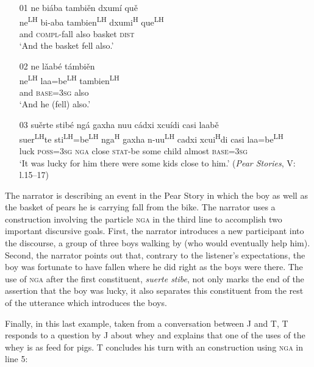 \ea\label{nga}
\begin{itemize}
\item[01]
\glll ne bi\'{a}ba tambi\v{e}n dxum\'{i} qu\v{e} \\
ne\textsuperscript{LH} bi-aba tambien\textsuperscript{LH} dxumi\textsuperscript{H} que\textsuperscript{LH} \\
and \textsc{compl}-fall also basket \textsc{dist} \\
\glt `And the basket fell also.'


\item[02]
\glll ne l\v{a}ab\'{e} t\'{a}mbi\v{e}n \\
ne\textsuperscript{LH} laa=be\textsuperscript{LH} tambien\textsuperscript{LH} \\
and \textsc{base}=3\textsc{sg} also \\
\glt `And he (fell) also.' 


\item[03]
\glll su\v{e}rte stib\'{e} ng\'{a} gaxha nuu c\'{a}dxi xcu\'{i}di casi laab\v{e}  \\
suer\textsuperscript{LH}te sti\textsuperscript{LH}=be\textsuperscript{LH} nga\textsuperscript{H} gaxha n-uu\textsuperscript{LH} cadxi xcui\textsuperscript{H}di casi laa=be\textsuperscript{LH}  \\
luck \textsc{poss}=3\textsc{sg} \textsc{nga} close \textsc{stat}-be some child almost \textsc{base}=3\textsc{sg}  \\
\glt `It was lucky for him there were some kids close to him.' \hfill (\textit{Pear Stories}, V: l.15--17)

\end{itemize}
\z
The narrator is describing an event in the Pear Story in which the boy as well as the basket of pears he is carrying fall from the bike. The narrator uses a construction involving the particle \textsc{nga} in the third line to accomplish two important discursive goals. First, the narrator introduces a new participant into the discourse, a group of three boys walking by (who would eventually help him). Second, the narrator points out that, contrary to the listener's expectations, the boy was fortunate to have fallen where he did right as the boys were there. The use of \textsc{nga} after the first constituent, \textit{suerte stibe}, not only marks the end of the assertion that the boy was lucky, it also separates this constituent from the rest of the utterance which introduces the boys. 

Finally, in this last example, taken from a conversation between J and T, T responds to a question by J about whey and explains that one of the uses of the whey is as feed for pigs. T concludes his turn with an  construction using \textsc{nga} in line 5:

